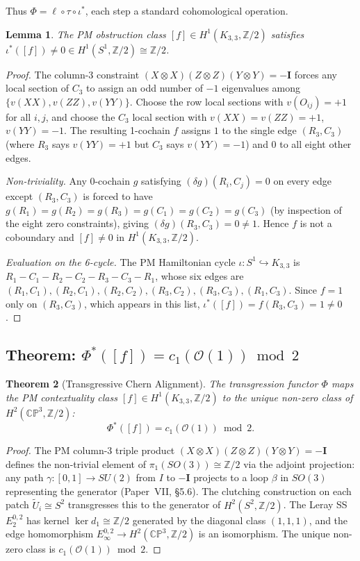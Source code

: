 \documentclass[11pt,a4paper]{article}
\newtheorem{theorem}{Theorem}[section]
\newtheorem{lemma}[theorem]{Lemma}
\theoremstyle{remark}
\newcommand{\CP}{\mathbb{CP}}
\newcommand{\Z}{\mathbb{Z}}
\newcommand{\cO}{\mathcal{O}}
\begin{document}
Thus $\Phi = \ell \circ \tau \circ \iota^*$, each step a standard
cohomological operation.

\begin{lemma}
\label{lem:iota-nonzero}
The PM obstruction class $[f] \in H^1(K_{3,3}, \Z/2)$ satisfies
$\iota^*([f]) \neq 0 \in H^1(S^1, \Z/2) \cong \Z/2$.
\end{lemma}

\begin{proof}
The column-3 constraint $(X\!\otimes\! X)(Z\!\otimes\! Z)(Y\!\otimes\! Y)=-\mathbf{I}$
forces any local section of $C_3$ to assign an odd number of $-1$
eigenvalues among $\{v(XX), v(ZZ), v(YY)\}$.
Choose the row local sections with $v(O_{ij})=+1$ for all $i,j$, and
choose the $C_3$ local section with $v(XX)=v(ZZ)=+1$, $v(YY)=-1$.
The resulting 1-cochain $f$ assigns $1$ to the single edge $(R_3, C_3)$
(where $R_3$ says $v(YY)=+1$ but $C_3$ says $v(YY)=-1$) and $0$
to all eight other edges.

\smallskip
\noindent\textit{Non-triviality.}
Any 0-cochain $g$ satisfying $({\delta g})(R_i, C_j)=0$ on every edge
except $(R_3, C_3)$ is forced to have $g(R_1)=g(R_2)=g(R_3)=g(C_1)=g(C_2)=g(C_3)$
(by inspection of the eight zero constraints), giving
$(\delta g)(R_3,C_3)=0\neq 1$. Hence $f$ is not a coboundary and
$[f]\neq 0$ in $H^1(K_{3,3},\Z/2)$.

\smallskip
\noindent\textit{Evaluation on the 6-cycle.}
The PM Hamiltonian cycle $\iota: S^1 \hookrightarrow K_{3,3}$ is
$R_1 - C_1 - R_2 - C_2 - R_3 - C_3 - R_1$, whose six edges are
$(R_1,C_1),(R_2,C_1),(R_2,C_2),(R_3,C_2),(R_3,C_3),(R_1,C_3)$.
Since $f=1$ only on $(R_3,C_3)$, which appears in this list,
$\iota^*([f]) = f(R_3,C_3) = 1 \neq 0$.
\end{proof}

\subsection{Theorem: $\Phi^*([f]) = c_1(\cO(1)) \bmod 2$}

\begin{theorem}[Transgressive Chern Alignment]
\label{thm:chern}
The transgression functor $\Phi$ maps the PM contextuality class
$[f] \in H^1(K_{3,3}, \Z/2)$ to the unique non-zero class of
$H^2(\CP^3, \Z/2)$:
\[
\Phi^*([f]) = c_1(\cO(1)) \bmod 2.
\]
\end{theorem}

\begin{proof}
The PM column-3 triple product
$(X\!\otimes\! X)(Z\!\otimes\! Z)(Y\!\otimes\! Y) = -\mathbf{I}$
defines the non-trivial element of $\pi_1(SO(3)) \cong \Z/2$ via the
adjoint projection: any path $\gamma: [0,1] \to SU(2)$ from $I$ to
$-\mathbf{I}$ projects to a loop $\beta$ in $SO(3)$ representing the
generator (Paper~VII, \S5.6). The clutching construction on each patch
$\tilde{U}_i \cong S^2$ transgresses this to the generator of
$H^2(S^2, \Z/2)$. The Leray SS $E_2^{0,2}$ has kernel
$\ker d_1 \cong \Z/2$ generated by the diagonal class $(1,1,1)$, and
the edge homomorphism $E_\infty^{0,2} \to H^2(\CP^3, \Z/2)$ is an
isomorphism. The unique non-zero class is $c_1(\cO(1)) \bmod 2$.
\end{proof}
\end{document}
